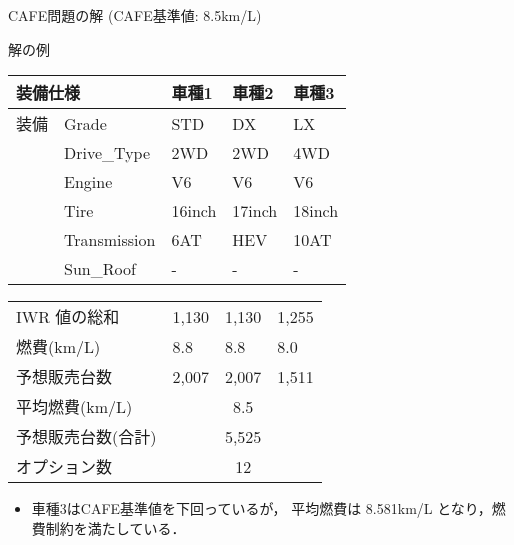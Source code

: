 \documentclass[dvipdfmx, 11pt]{beamer}
\begin{document}
\begin{frame}{CAFE問題の解 {\normalsize (CAFE基準値: 8.5km/L)}}\small
 \begin{exampleblock}{解の例}
  \centering
  \renewcommand{\arraystretch}{0.9}
  \begin{tabular}{p{10mm}|p{25mm}|p{15mm}|p{15mm}|p{15mm}} 
    \multicolumn{2}{l|}{装備仕様}  & 車種1 & 車種2 & 車種3 \\\hline
    装備 & \textsf{Grade}   & \textsf{STD}    & \textsf{DX}     & \textsf{LX}\\
    &\textsf{Drive\_Type}  & \textsf{2WD}    & \textsf{2WD}    & \textsf{4WD}\\
    &\textsf{Engine}	  & \textsf{V6}     & \textsf{V6}     & \textsf{V6}\\
    &\textsf{Tire}	  & \textsf{16inch} & \textsf{17inch} & \textsf{18inch}\\
    &\textsf{Transmission} & \textsf{6AT}    & \textsf{HEV}    & \textsf{10AT}\\
    &\textsf{Sun\_Roof}    & -               & -              & - 
   \end{tabular}
 \end{exampleblock}
 \pause
 
 \begin{block}{}
  \centering
  \renewcommand{\arraystretch}{0.9}
  \begin{tabular}{p{38mm}|p{15mm}|p{15mm}|p{15mm}} 
    IWR 値の総和    & 1,130  & 1,130   & 1,255 \\ %
    燃費(km/L)      & 8.8  & 8.8     & 8.0 \\ %
    予想販売台数    & 2,007   & 2,007   & 1,511  \\ \hline
    平均燃費(km/L)  & \multicolumn{3}{c}{8.5} \\ 
    予想販売台数(合計)  & \multicolumn{3}{c}{5,525} \\ 
    オプション数 & \multicolumn{3}{c}{12}	
  \end{tabular}
 \end{block}
 \vfill
 \begin{itemize}
 \item 車種3はCAFE基準値を下回っているが，
       平均燃費は 8.581km/L となり，燃費制約を満たしている．
 \end{itemize}
\end{frame}
\end{document}
